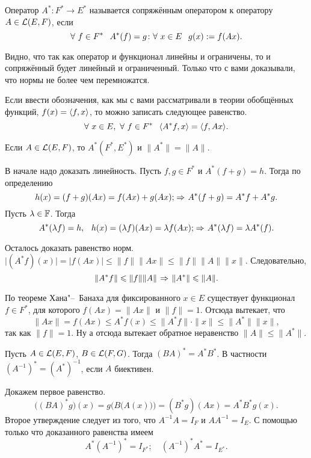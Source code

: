 \begin{Def}
 Оператор $A^*\colon F^*\to E^*$ называется сопряжённым оператором к оператору $A\in \mathcal L(E,F)$, если 
\[
  \forall\ f\in F^*\pau A^*(f) = g\colon \forall\ x\in E\pau g(x):=f(Ax).
\]
\end{Def}
Видно, что так как оператор и функционал линейны и ограничены, то и сопряжённый будет линейный и ограниченный. Только что с вами доказывали, что нормы не более чем перемножатся.

Если ввести обозначения, как мы с вами рассматривали в теории обобщённых функций, $f(x) = \langle f,x\rangle$, то можно записать следующее равенство.
\[
  \forall\ x\in E,\ \forall\ f\in F^*\pau \la A^*f,x\ra = \la f,Ax\ra.
\]

\begin{Ut}
  Если $A\in\mathcal L(E,F)$, то $A^*(F^*,E^*)$ и $\|A^*\|=\|A\|$.
\end{Ut}
\begin{Proof}
  В начале надо доказать линейность. Пусть $f,g\in F^*$ и $A^*(f+g)=h$. Тогда по определению 
\[
h(x) = (f+g)(Ax) = f(Ax) + g(Ax);\hspace{1pt plus1pt}\Rightarrow\hspace{1pt plus1pt} A^*(f+g) = A^*f+A^*g.
\]
Пусть $\lambda\in\mathbb F$. Тогда
\[
  A^*(\lambda f) = h,\hskip .75em plus.1em minus.08em\relax h(x) = (\lambda f)(Ax) = \lambda f(Ax);\hspace{1pt plus1pt}\Rightarrow\hspace{1pt plus1pt} A^*(\lambda f) = \lambda A^*(f).
\]

Осталось доказать равенство норм. $\big|(A^*f)(x)\big| = \big|f(Ax)\big|\le \|f\|\|Ax\|\le \|f\|\|A\|\|x\|$. Следовательно,
\[
  \|A^*f\|\leqslant \|f\|\|A\|\hspace{1pt plus1pt}\Rightarrow\hspace{1pt plus1pt} \|A^*\|\leqslant \|A\|.
\]

По теореме Хана"--~Банаха для фиксированного $x\in E$ существует функционал $f\in F^*$, для которого $f(Ax) = \|Ax\|$ и $\|f\|=1$. Отсюда вытекает, что 
\[
\|Ax\| = f(Ax)\le A^*f(x)\le \|A^*f\|\cdot\|x\|\le \|A^*\|\|x\|,
\]
так как $\|f\|=1$. Ну а отсюда вытекает обратное неравенство $\|A\|\le \|A^*\|$.
\end{Proof}
\begin{Ut}
  Пусть $A\in \mathcal L(E,F)$, $B\in \mathcal L(F,G)$. Тогда $(BA)^* = A^*B^*$. В частности $(A^{-1})^* = (A^*)^{-1}$, если $A$ биективен.
\end{Ut}
\begin{Proof}
Докажем первое равенство.
\[
  \big((BA)^*g\big)(x) =g\Big(B\big(A(x)\big)\Big) = (B^*g)(Ax) = A^*B^*g(x).
\]
Второе утверждение следует из того, что $A^{-1}A = I_F$ и $AA^{-1} = I_E$. С помощью только что доказанного равенства имеем
\[
  A^*(A^{-1})^* = I_{F^*};\quad (A^{-1})^*A^* = I_{E^*}.
\]
\end{Proof}


